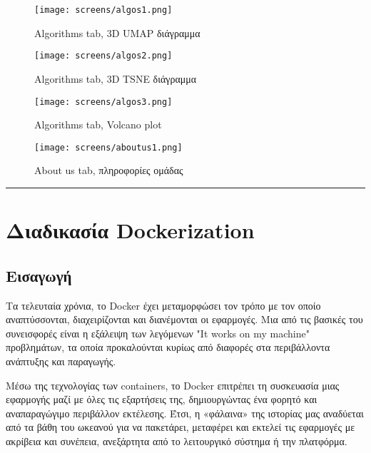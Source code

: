 \documentclass{article}  %
\begin{document}
\begin{figure}[H]
    \centering
    \texttt{[image: screens/algos1.png]}
    \caption{Algorithms tab, 3D UMAP διάγραμμα}
    \label{fig:algos1}
\end{figure}

\begin{figure}[H]
    \centering
    \texttt{[image: screens/algos2.png]}
    \caption{Algorithms tab, 3D TSNE διάγραμμα}
    \label{fig:algos2}
\end{figure}

\begin{figure}[H]
    \centering
    \texttt{[image: screens/algos3.png]}
    \caption{Algorithms tab, Volcano plot}
    \label{fig:algos3}
\end{figure}

\begin{figure}[H]
    \centering
    \texttt{[image: screens/aboutus1.png]}
    \caption{About us tab, πληροφορίες ομάδας}
    \label{fig:aboutus1}
\end{figure}

\noindent\rule{\linewidth}{0.4pt}

\section{Διαδικασία  {Dockerization}}
\label{sec:dockerization}

\subsection{Εισαγωγή}
Τα τελευταία χρόνια, το  {Docker} έχει μεταμορφώσει τον τρόπο με τον οποίο αναπτύσσονται, διαχειρίζονται και διανέμονται οι εφαρμογές. Μια από τις βασικές του συνεισφορές είναι η εξάλειψη των λεγόμενων  {"It works on my machine"} προβλημάτων, τα οποία προκαλούνται κυρίως από διαφορές στα περιβάλλοντα ανάπτυξης και παραγωγής\cite{singh2021machine}.

Μέσω της τεχνολογίας των  containers, το  Docker επιτρέπει τη συσκευασία μιας εφαρμογής μαζί με όλες τις εξαρτήσεις της, δημιουργώντας ένα φορητό και αναπαραγώγιμο περιβάλλον εκτέλεσης\cite{singh2021machine}. Έτσι, η «φάλαινα» της ιστορίας μας αναδύεται από τα βάθη του ωκεανού για να πακετάρει, μεταφέρει και εκτελεί τις εφαρμογές με ακρίβεια και συνέπεια, ανεξάρτητα από το λειτουργικό σύστημα ή την πλατφόρμα.
\end{document}
